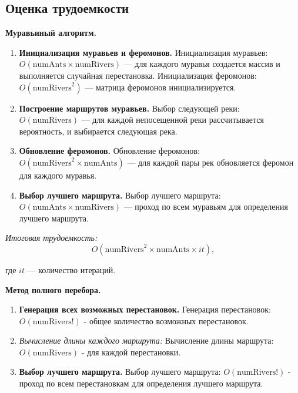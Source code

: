 \documentclass[12pt, a4paper]{article}
\begin{document}
\subsection{Оценка трудоемкости}
\textbf{Муравьиный алгоритм.}
\begin{enumerate}
  \item \textbf{Инициализация муравьев и феромонов.}
      Инициализация муравьев: \(O(\text{{numAnts}} \times 
      \text{{numRivers}})\) --- для каждого муравья создается массив и 
      выполняется случайная перестановка.
      Инициализация феромонов: \(O(\text{{numRivers}}^2)\) --- 
      матрица феромонов инициализируется.
  \item \textbf{Построение маршрутов муравьев.}
      Выбор следующей реки: \(O(\text{{numRivers}})\) --- для 
      каждой непосещенной реки рассчитывается вероятность, и выбирается 
      следующая река.
  \item \textbf{Обновление феромонов.}
      Обновление феромонов: \(O(\text{{numRivers}}^2 \times 
      \text{{numAnts}})\) --- для каждой пары рек обновляется феромон 
      для каждого муравья.
  \item \textbf{Выбор лучшего маршрута.}
      Выбор лучшего маршрута: \(O(\text{{numAnts}} \times 
      \text{{numRivers}})\) --- проход по всем муравьям для определения 
      лучшего маршрута.
\end{enumerate}

\textit{Итоговая трудоемкость:} 
\[O(\text{{numRivers}}^2 \times \text{{numAnts}} \times it),\]

где $it$ --- количество итераций.


\textbf{Метод полного перебора.}

\begin{enumerate}
  \item \textbf{Генерация всех возможных перестановок.}
      Генерация перестановок: \(O(\text{{numRivers}}!)\) - общее 
      количество возможных перестановок.
    
  \item \textit{Вычисление длины каждого маршрута:}
      Вычисление длины маршрута: \(O(\text{{numRivers}})\) - для каждой 
      перестановки.
    
  \item \textbf{Выбор лучшего маршрута.}
      Выбор лучшего маршрута: \(O(\text{{numRivers}}!)\) - проход по 
      всем перестановкам для определения лучшего маршрута.
\end{enumerate}
\end{document}
